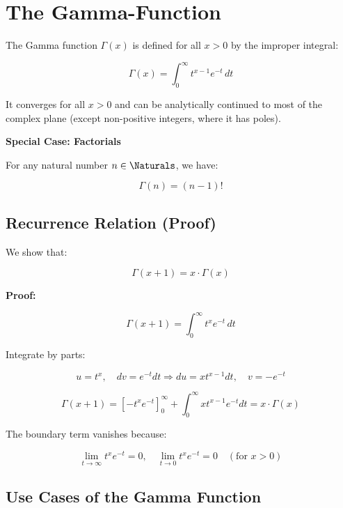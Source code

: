 \newpage
\section{The Gamma-Function}

The Gamma function \( \Gamma(x) \) is defined for all \( x > 0 \) by the improper integral:

\[
    \Gamma(x) = \int_0^\infty t^{x-1} e^{-t} \,dt
\]

It converges for all \( x > 0 \) and can be analytically continued to most of the complex plane 
(except non-positive integers, where it has poles).

\textbf{Special Case: Factorials}

For any natural number \( n \in \Naturals \), we have:

\[
    \Gamma(n) = (n - 1)!
\]

\subsection{Recurrence Relation (Proof)}

We show that:

\[
    \Gamma(x + 1) = x \cdot \Gamma(x)
\]

\textbf{Proof:}

\[
    \Gamma(x + 1) = \int_0^\infty t^x e^{-t} \,dt
\]

Integrate by parts:

\[
    u = t^x, \quad dv = e^{-t} dt \Rightarrow du = x t^{x-1} dt, \quad v = -e^{-t}
\]

\[
    \Gamma(x + 1) = {\left[ -t^x e^{-t} \right]}_{0}^{\infty} + \int_0^\infty x t^{x-1} e^{-t} dt = x \cdot \Gamma(x)
\]

The boundary term vanishes because:

\[
    \lim_{t \to \infty} t^x e^{-t} = 0, \quad \lim_{t \to 0} t^x e^{-t} = 0 \quad (\text{for } x > 0)
\]

\subsection{Use Cases of the Gamma Function}

